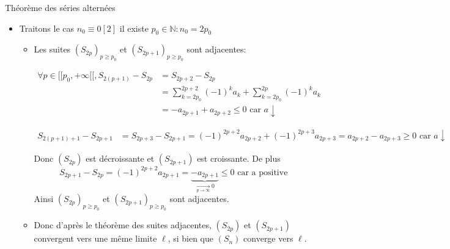 \documentclass{article}
\begin{document}
\begin{question_kholle}[{Soit $(a_{n})_{n\geqslant n_{0}} \in \mathbb{R}^{[ \! [ n_{0}, +\infty [ \![}$ une suite réelle.
    Si
    $$
    \left\{ \begin{array}{ll}
        \forall n \in [ \! [ n_{0}, +\infty [\![, a_{n} \geqslant 0 \\
        (a_{n})_{n\geqslant n_{0}} \text{ est décroissante} \\
        \lim_{ n \to \infty } a_{n}=0
    \end{array}\right.
    $$
    alors $\sum_{n\geqslant n_{0}}(-1)^{n}a_{n}$}]{Théorème des séries alternées}
    
    \begin{itemize}[label=$\lozenge$]
        \item Traitons le cas $n_{0}\equiv 0 [2]$ il existe $p_{0} \in \mathbb{N}: n_{0}=2p_{0}$
        \begin{itemize}[label=$\star$]
            \item  Les suites $(S_{2p})_{p\geqslant p_{0}}$ et $(S_{2p+1})_{p\geqslant p_{0}}$ sont adjacentes:
            
            \begin{align*}
                \forall p \in [ \! [ p_{0}, +\infty[ \![, S_{2(p+1)} - S_{2p} &= S_{2p+2}- S_{2p} \\
                &= \sum_{k=2p_{0}}^{2p+2}(-1)^{k}a_{k} + \sum_{k=2p_{0}}^{2p}(-1)^{k}a_{k} \\
                &= -a_{2p+1}+a_{2p+2} \leqslant 0 \text{ car }a\downarrow
            \end{align*}
            
            \begin{align*}
                S_{2(p+1)+1} - S_{2p+1} &= S_{2p+3} - S_{2p+1} = (-1)^{2p+2}a_{2p+2}+(-1)^{2p+3}a_{2p+3} = a_{2p+2}- a_{2p+3} \geqslant 0 \text{ car }a\downarrow
            \end{align*}
            
            
            Donc $(S_{2p})$ est décroissante et $(S_{2p+1})$ est croissante.
            De plus
$$
            S_{2p+1} - S_{2p} = (-1)^{2p+2}a_{2p+1} = \underbrace{ -a_{2p+1} }_{ \xrightarrow[p \to \infty]{} 0 } \leqslant 0 \text{ car a positive}
$$
            Ainsi $(S_{2p})_{p\geqslant p_{0}}$ et $(S_{2p+1})_{p\geqslant p_{0}}$ sont adjacentes.
            \item Donc d'après le théorème des suites adjacentes, $(S_{2p})$ et $(S_{2p+1})$ convergent vers une même limite $\ell$, si bien que $(S_{n})$ converge vers $\ell$.
            

\end{itemize}
\end{itemize}
\end{question_kholle}
\end{document}
